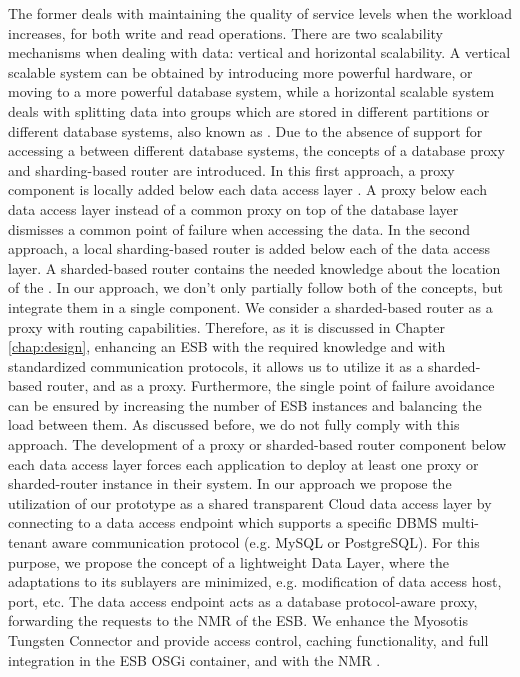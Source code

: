The former deals with maintaining the quality of service levels when the workload increases, for both write and read operations. There are two scalability mechanisms when dealing with data: vertical and horizontal scalability. A vertical scalable system can be obtained by introducing more powerful hardware, or moving to a more powerful database system, while a horizontal scalable system deals with splitting data into groups which are stored in different partitions or different database systems, also known as . Due to the absence of support for accessing a  between different database systems, the concepts of a database proxy and sharding-based router are introduced. In this first approach, a proxy component is locally added below each data access layer \cite{strauchABKL2012}. A proxy below each data access layer instead of a common proxy on top of the database layer dismisses a common point of failure when accessing the data. In the second approach, a local sharding-based router is added below each of the data access layer. A sharded-based router contains the needed knowledge about the location of the . In our approach, we don't only partially follow both of the concepts, but integrate them in a single component. We consider a sharded-based router as a proxy with routing capabilities. Therefore, as it is discussed in Chapter \ref{chap:design}, enhancing an \ac{ESB} with the required  knowledge and with standardized communication protocols, it allows us to utilize it as a sharded-based router, and as a proxy. Furthermore, the single point of failure avoidance can be ensured by increasing the number of \ac{ESB} instances and balancing the load between them. As discussed before, we do not fully comply with this approach. The development of a proxy or sharded-based router component below each data access layer forces each application to deploy at least one proxy or sharded-router instance in their system. In our approach we propose the utilization of our prototype as a shared transparent Cloud data access layer by connecting to a data access endpoint which supports a specific \ac{DBMS} multi-tenant aware communication protocol (e.g. MySQL or PostgreSQL). For this purpose, we propose the concept of a lightweight Data Layer, where the adaptations to its sublayers are minimized, e.g. modification of data access host, port, etc. The data access endpoint acts as a database protocol-aware proxy, forwarding the requests to the \ac{NMR} of the \ac{ESB}. We enhance the Myosotis Tungsten Connector and provide access control, caching functionality, and full integration in the \ac{ESB} \ac{OSGi} container, and with the \ac{NMR} \cite{tungstenwiki}.

